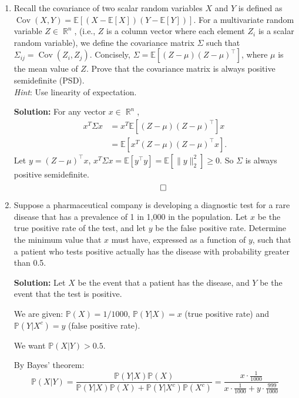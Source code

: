 \documentclass{article}
\DeclareMathOperator{\cov}{\mathrm{Cov}}
\DeclareMathOperator{\R}{\mathbb{R}}
\newenvironment{solution}{\color{blue} \smallskip \textbf{Solution:}}{}
\begin{document}
\begin{enumerate} 
    
    \item 
    Recall the covariance of two scalar random variables $X$ and $Y$ is defined as $\cov(X,Y)=\mathbb{E}[(X-\mathbb{E}[X])(Y-\mathbb{E}[Y])]$. 
    For a multivariate random variable $Z \in \R^n$, (i.e., $Z$ is a column vector where each element $Z_i$ is a scalar random variable), we define the covariance matrix $\Sigma$ such that $\Sigma_{ij}=\cov(Z_i, Z_j)$. 
    Concisely, $\Sigma=\mathbb{E}[(Z-\mu)(Z-\mu)^\top ]$, where $\mu$ is the mean value of $Z$. 
    Prove that the covariance matrix is always positive semidefinite (PSD). \\
    \emph{Hint}: Use linearity of expectation.

    \begin{solution}
        For any vector $x \in \R^n$,
        \begin{align*}
        x^T\Sigma x &= x^T\mathbb{E}[(Z-\mu)(Z-\mu)^\top] x \\
        &= \mathbb{E}[x^T(Z-\mu)(Z-\mu)^\top x].
        \end{align*} 
        Let $y=(Z-\mu)^\top x$, $x^T\Sigma x = \mathbb{E}[y^\top y] = \mathbb{E}[\|y\|^2_2] \geq 0$.
        So $\Sigma$ is always positive semidefinite.
        \[\qedhere\]
        
    \end{solution}

    \item
    Suppose a pharmaceutical company is developing a diagnostic test for a rare disease that has a prevalence of 1 in 1,000 in the population. 
    Let $x$ be the true positive rate of the test, and let $y$ be the false positive rate. 
    Determine the minimum value that $x$ must have, expressed as a function of $y$, such that a patient who tests positive actually has the disease with probability greater than 0.5.

    \begin{solution}
        Let $X$ be the event that a patient has the disease, and $Y$ be the event that the test is positive.

        We are given:
        $\mathbb{P}(X) = 1/1000$, 
        $\mathbb{P}(Y|X) = x$ (true positive rate) and 
        $\mathbb{P}(Y|X^c) = y$ (false positive rate).

        We want $\mathbb{P}(X|Y) > 0.5$.

        By Bayes' theorem:
        \[
        \mathbb{P}(X|Y) = \frac{\mathbb{P}(Y|X)\mathbb{P}(X)}{\mathbb{P}(Y|X)\mathbb{P}(X) + \mathbb{P}(Y|X^c)\mathbb{P}(X^c)}
        = \frac{x \cdot \frac{1}{1000}}{x \cdot \frac{1}{1000} + y \cdot \frac{999}{1000}}
        \]


\end{solution}
\end{enumerate}
\end{document}
